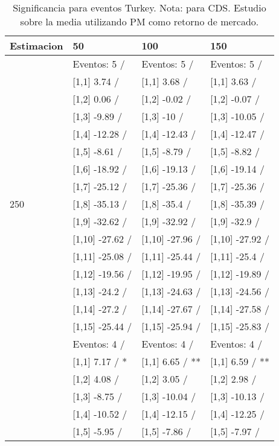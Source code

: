 \begin{table}

\caption{Significancia para eventos Turkey. Nota: para CDS. Estudio sobre la media utilizando PM como retorno de mercado.}
\centering
\begin{tabular}[t]{llll}
\toprule
Estimacion & 50 & 100 & 150\\
\midrule
 & Eventos:  5 / & Eventos:  5 / & Eventos:  5 /\\
 & {}[1,1] 3.74  / & {}[1,1] 3.68  / & {}[1,1] 3.63  /\\
 & {}[1,2] 0.06  / & {}[1,2] -0.02  / & {}[1,2] -0.07  /\\
 & {}[1,3] -9.89  / & {}[1,3] -10  / & {}[1,3] -10.05  /\\
 & {}[1,4] -12.28  / & {}[1,4] -12.43  / & {}[1,4] -12.47  /\\
\addlinespace
 & {}[1,5] -8.61  / & {}[1,5] -8.79  / & {}[1,5] -8.82  /\\
 & {}[1,6] -18.92  / & {}[1,6] -19.13  / & {}[1,6] -19.14  /\\
 & {}[1,7] -25.12  / & {}[1,7] -25.36  / & {}[1,7] -25.36  /\\
250 & {}[1,8] -35.13  / & {}[1,8] -35.4  / & {}[1,8] -35.39  /\\
 & {}[1,9] -32.62  / & {}[1,9] -32.92  / & {}[1,9] -32.9  /\\
\addlinespace
 & {}[1,10] -27.62  / & {}[1,10] -27.96  / & {}[1,10] -27.92  /\\
 & {}[1,11] -25.08  / & {}[1,11] -25.44  / & {}[1,11] -25.4  /\\
 & {}[1,12] -19.56  / & {}[1,12] -19.95  / & {}[1,12] -19.89  /\\
 & {}[1,13] -24.2  / & {}[1,13] -24.63  / & {}[1,13] -24.56  /\\
 & {}[1,14] -27.2  / & {}[1,14] -27.67  / & {}[1,14] -27.58  /\\
\addlinespace
 & {}[1,15] -25.44  / & {}[1,15] -25.94  / & {}[1,15] -25.83  /\\
 & Eventos:  4 / & Eventos:  4 / & Eventos:  4 /\\
 & {}[1,1] 7.17  / * & {}[1,1] 6.65  / ** & {}[1,1] 6.59  / **\\
 & {}[1,2] 4.08  / & {}[1,2] 3.05  / & {}[1,2] 2.98  /\\
 & {}[1,3] -8.75  / & {}[1,3] -10.04  / & {}[1,3] -10.13  /\\
\addlinespace
 & {}[1,4] -10.52  / & {}[1,4] -12.15  / & {}[1,4] -12.25  /\\
 & {}[1,5] -5.95  / & {}[1,5] -7.86  / & {}[1,5] -7.97  /\\

\end{tabular}
\end{table}
